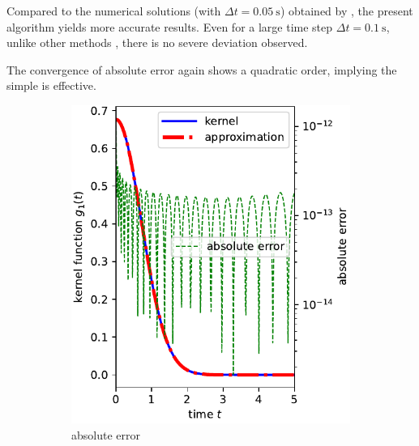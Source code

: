 Compared to the numerical solutions (with $\Delta{}t=\SI{0.05}{\second}$) obtained by \citet{Cortes2009}, the present algorithm yields more accurate results. Even for a large time step $\Delta{}t=\SI{0.1}{\second}$, unlike other methods \citep{Liu2023}, there is no severe deviation observed.

The convergence of absolute error again shows a quadratic order, implying the simple  is effective.


\begin{figure}
\centering
\begin{subfigure}[b]{0.49\textwidth}
\centering
\includegraphics{PIC/g1}
\caption{absolute error}
\end{subfigure}
\begin{subfigure}[b]{0.49\textwidth}
\centering

\end{subfigure}
\end{figure}
